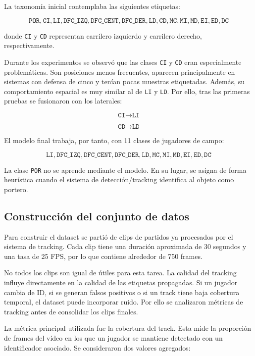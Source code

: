 La taxonomía inicial contemplaba las siguientes etiquetas:

\[
\texttt{POR}, \texttt{CI}, \texttt{LI}, \texttt{DFC\_IZQ}, \texttt{DFC\_CENT}, \texttt{DFC\_DER}, \texttt{LD}, \texttt{CD}, \texttt{MC}, \texttt{MI}, \texttt{MD}, \texttt{EI}, \texttt{ED}, \texttt{DC}
\]

donde \texttt{CI} y \texttt{CD} representan carrilero izquierdo y carrilero derecho, respectivamente.

Durante los experimentos se observó que las clases \texttt{CI} y \texttt{CD} eran especialmente problemáticas. Son posiciones menos frecuentes, aparecen principalmente en sistemas con defensa de cinco y tenían pocas muestras etiquetadas. Además, su comportamiento espacial es muy similar al de \texttt{LI} y \texttt{LD}. Por ello, tras las primeras pruebas se fusionaron con los laterales:

\[
\texttt{CI} \rightarrow \texttt{LI}
\]

\[
\texttt{CD} \rightarrow \texttt{LD}
\]

El modelo final trabaja, por tanto, con 11 clases de jugadores de campo:

\[
\texttt{LI}, \texttt{DFC\_IZQ}, \texttt{DFC\_CENT}, \texttt{DFC\_DER}, \texttt{LD}, \texttt{MC}, \texttt{MI}, \texttt{MD}, \texttt{EI}, \texttt{ED}, \texttt{DC}
\]

La clase \texttt{POR} no se aprende mediante el modelo. En su lugar, se asigna de forma heurística cuando el sistema de detección/tracking identifica al objeto como portero.

\subsection{Construcción del conjunto de datos}

Para construir el dataset se partió de clips de partidos ya procesados por el sistema de tracking. Cada clip tiene una duración aproximada de 30 segundos y una tasa de 25 FPS, por lo que contiene alrededor de 750 frames.

No todos los clips son igual de útiles para esta tarea. La calidad del tracking influye directamente en la calidad de las etiquetas propagadas. Si un jugador cambia de ID, si se generan falsos positivos o si un track tiene baja cobertura temporal, el dataset puede incorporar ruido. Por ello se analizaron métricas de tracking antes de consolidar los clips finales.

La métrica principal utilizada fue la cobertura del track. Esta mide la proporción de frames del vídeo en los que un jugador se mantiene detectado con un identificador asociado. Se consideraron dos valores agregados:

